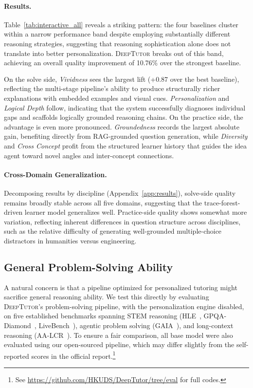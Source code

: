 \paragraph{Results.}
Table~\ref{tab:interactive_all} reveals a striking pattern: the four baselines cluster within a narrow performance band despite employing substantially different reasoning strategies, suggesting that reasoning sophistication alone does not translate into better personalization.
\textsc{DeepTutor} breaks out of this band, achieving an overall quality improvement of 10.76\% over the strongest baseline.

On the solve side, \emph{Vividness} sees the largest lift (+0.87 over the best baseline), reflecting the multi-stage pipeline's ability to produce structurally richer explanations with embedded examples and visual cues.
\emph{Personalization} and \emph{Logical Depth} follow, indicating that the system successfully diagnoses individual gaps and scaffolds logically grounded reasoning chains.
On the practice side, the advantage is even more pronounced.
\emph{Groundedness} records the largest absolute gain, benefiting directly from RAG-grounded question generation, while \emph{Diversity} and \emph{Cross Concept} profit from the structured learner history that guides the idea agent toward novel angles and inter-concept connections.

\paragraph{Cross-Domain Generalization.}
Decomposing results by discipline (Appendix~\ref{app:results}), solve-side quality remains broadly stable across all five domains, suggesting that the trace-forest-driven learner model generalizes well.
Practice-side quality shows somewhat more variation, reflecting inherent differences in question structure across disciplines, such as the relative difficulty of generating well-grounded multiple-choice distractors in humanities versus engineering.

\subsection{General Problem-Solving Ability}
\label{sec:generalization}

A natural concern is that a pipeline optimized for personalized tutoring might sacrifice general reasoning ability.
We test this directly by evaluating \textsc{DeepTutor}'s problem-solving pipeline, with the personalization engine disabled, on five established benchmarks spanning STEM reasoning (HLE~\citep{phan2025hle}, GPQA-Diamond~\citep{rein2024gpqa}, LiveBench~\citep{white2025livebench}), agentic problem solving (GAIA~\citep{mialon2024gaia}), and long-context reasoning (AA-LCR~\citep{artificialanalysis2025lcr}).
To ensure a fair comparison, all base model were also evaluated using our open-sourced pipeline, which may differ slightly from the self-reported scores in the official report.\footnote{See \url{https://github.com/HKUDS/DeepTutor/tree/eval} for full codes.}

